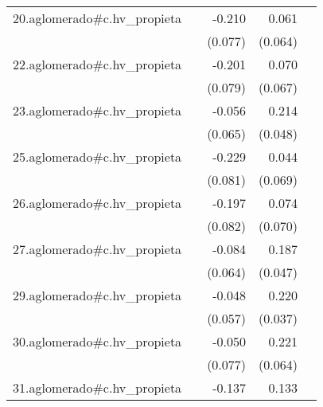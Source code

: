 {\begin{longtable}{l*{4}{D{.}{.}{-1}}}
\addlinespace
20.aglomerado#c.hv\_propieta&                     &      -0.210\sym{**} &       0.061         &                     \\
            &                     &     (0.077)         &     (0.064)         &                     \\
\addlinespace
22.aglomerado#c.hv\_propieta&                     &      -0.201\sym{*}  &       0.070         &                     \\
            &                     &     (0.079)         &     (0.067)         &                     \\
\addlinespace
23.aglomerado#c.hv\_propieta&                     &      -0.056         &       0.214\sym{***}&                     \\
            &                     &     (0.065)         &     (0.048)         &                     \\
\addlinespace
25.aglomerado#c.hv\_propieta&                     &      -0.229\sym{**} &       0.044         &                     \\
            &                     &     (0.081)         &     (0.069)         &                     \\
\addlinespace
26.aglomerado#c.hv\_propieta&                     &      -0.197\sym{*}  &       0.074         &                     \\
            &                     &     (0.082)         &     (0.070)         &                     \\
\addlinespace
27.aglomerado#c.hv\_propieta&                     &      -0.084         &       0.187\sym{***}&                     \\
            &                     &     (0.064)         &     (0.047)         &                     \\
\addlinespace
29.aglomerado#c.hv\_propieta&                     &      -0.048         &       0.220\sym{***}&                     \\
            &                     &     (0.057)         &     (0.037)         &                     \\
\addlinespace
30.aglomerado#c.hv\_propieta&                     &      -0.050         &       0.221\sym{***}&                     \\
            &                     &     (0.077)         &     (0.064)         &                     \\
\addlinespace
31.aglomerado#c.hv\_propieta&                     &      -0.137         &       0.133\sym{*}  &                     \\

\end{longtable}}
